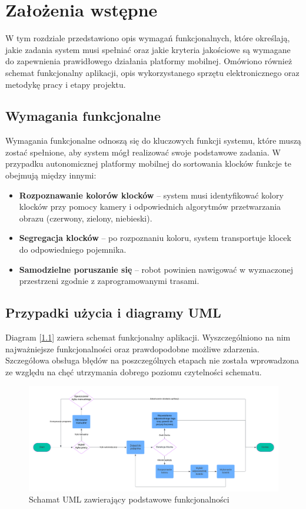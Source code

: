 \chapter{Założenia wstępne}
\label{ch:zalozenia-wstepne}

W tym rozdziale przedstawiono opis wymagań funkcjonalnych, które określają, jakie zadania system musi spełniać oraz jakie kryteria jakościowe są wymagane do zapewnienia prawidłowego działania platformy mobilnej. Omówiono również schemat funkcjonalny aplikacji, opis wykorzystanego sprzętu elektronicznego oraz metodykę pracy i etapy projektu.


\section{Wymagania funkcjonalne}
Wymagania funkcjonalne odnoszą się do kluczowych funkcji systemu, które muszą zostać spełnione, aby system mógł realizować swoje podstawowe zadania. W przypadku autonomicznej platformy mobilnej do sortowania klocków funkcje te obejmują między innymi:
\begin{itemize}
    \item \textbf{Rozpoznawanie kolorów klocków} – system musi identyfikować kolory klocków przy pomocy kamery i odpowiednich algorytmów przetwarzania obrazu (czerwony, zielony, niebieski).
    \item \textbf{Segregacja klocków} – po rozpoznaniu koloru, system transportuje klocek do odpowiedniego pojemnika.
    \item \textbf{Samodzielne poruszanie się} – robot powinien nawigować w wyznaczonej przestrzeni zgodnie z zaprogramowanymi trasami.
\end{itemize}

\section{Przypadki użycia i diagramy UML}

Diagram [\ref{rys1:schemat_uml}] zawiera schemat funkcjonalny aplikacji. Wyszczególniono na nim najważniejsze funkcjonalności oraz prawdopodobne możliwe zdarzenia. Szczegółowa obsługa błędów na poszczególnych etapach nie została wprowadzona ze względu na chęć utrzymania dobrego poziomu czytelności schematu. 

\begin{figure}[h]
    \centering
    \includegraphics[width=1.0\textwidth]{./graf/uml.png}
    \caption{Schamat UML zawierający podstawowe funkcjonalności}
    \label{rys1:schemat_uml}
\end{figure}

